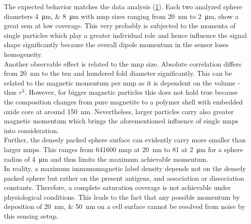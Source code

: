 The expected behavior matches the data analysis (\cref{fig:sim:coverage}). Each two analyzed sphere diameters \SIlist{4;8}{\micro\meter} with \gls{mnp} sizes ranging from \SI{20}{\nano\meter} to \SI{2}{\micro\meter}, show a great \gls{sem} at low coverage. This very probably is subjected to the momenta of single particles which play a greater individual role and hence influence the signal shape significantly because the overall dipole momentum in the sensor loses homogeneity. \\
Another observable effect is related to the \gls{mnp} size. Absolute correlation differs from \SI{20}{\nano\meter} to the ten and hundered fold diameter significantly. This can be related to the magnetic momentum per \gls{mnp} as it is dependent on the volume - thus $r^3$. However, for bigger magnetic particles this does not hold true because the composition changes from pure magnetite to a polymer shell with embedded oxide core at around \SI{150}{\nano\meter}. Nevertheless, larger particles carry also greater magnetic momentum which brings the aforementioned influence of single \glspl{mnp} into consideration. \\ 
Further, the densely packed sphere surface can evidently carry more smaller than larger \glspl{mnp}. This ranges from \num{641600} \gls{mnp} at \SI{20}{\nano\meter} to \num{81} at \SI{2}{\micro\meter} for a sphere radius of \SI{4}{\micro\meter} and thus limits the maximum achievable momentum. \\
In reality, a maximum immunomagnetic label density depends not on the densely packed sphere but rather on the present antigens, and association or dissociation constants. Therefore, a complete saturation coverage is not achievable under physiological conditions. This leads to the fact that any possible momentum by deposition of \SIlist{20;50}{\nano\meter} on a cell surface cannot be resolved from noise by this sensing setup.

\begin{figure}
	\centering
	 \hfill
	\addtocounter{subfigure}{-1}
	 \\
	\vspace{\baselineskip}	
	\addtocounter{subfigure}{-1}
	\hfill
	\addtocounter{subfigure}{-1}
\label{fig:sim:coverage}
\end{figure}

